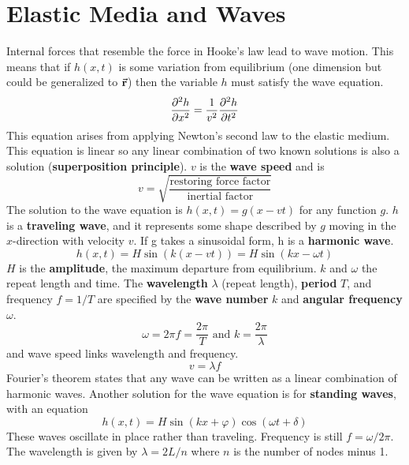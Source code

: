 \section{Elastic Media and Waves}
    Internal forces that resemble the force in Hooke's law lead to wave motion. This means that if $h(x, t)$ is some variation from equilibrium (one dimension but could be generalized to $\va{r}$) then the variable $h$ must satisfy the wave equation. 
    \begin{equation*}
        \pdv[2]{h}{x} = \frac{1}{v^2} \pdv[2]{h}{t}
    \end{equation*}
    This equation arises from applying Newton's second law to the elastic medium. This equation is linear so any linear combination of two known solutions is also a solution (\textbf{superposition principle}). $v$ is the \textbf{wave speed} and is $$v = \sqrt{\frac{\text{restoring force factor}}{\text{inertial factor}}}$$
    The solution to the wave equation is $h(x, t) = g(x - vt)$ for any function $g$. $h$ is a \textbf{traveling wave}, and it represents some shape described by $g$ moving in the $x$-direction with velocity $v$. If g takes a sinusoidal form, h is a \textbf{harmonic wave}.
    \begin{equation*}
        h(x, t)= H\sin(k(x - vt)) = H\sin(kx - \omega t)
    \end{equation*}
    $H$ is the \textbf{amplitude}, the maximum departure from equilibrium. $k$ and $\omega$ the repeat length and time. The \textbf{wavelength} $\lambda$ (repeat length), \textbf{period} $T$, and frequency $f = 1 / T$ are specified by the \textbf{wave number} $k$ and \textbf{angular frequency} $\omega$. 
    \begin{equation*}
        \omega = 2\pi f = \frac{2\pi}{T} \text{ and } k = \frac{2\pi}{\lambda}
    \end{equation*}
    and wave speed links wavelength and frequency.
    \begin{equation*}
        v = \lambda f
    \end{equation*}
    Fourier's theorem states that any wave can be written as a linear combination of harmonic waves.
    \newline \indent
    Another solution for the wave equation is for \textbf{standing waves}, with an equation
    \begin{equation*}
        h(x, t) = H\sin(kx + \varphi)\cos (\omega t + \delta)
    \end{equation*}
    These waves oscillate in place rather than traveling. Frequency is still $f = \omega / 2\pi$. The wavelength is given by $\lambda = 2L / n$ where $n$ is the number of nodes minus 1.
